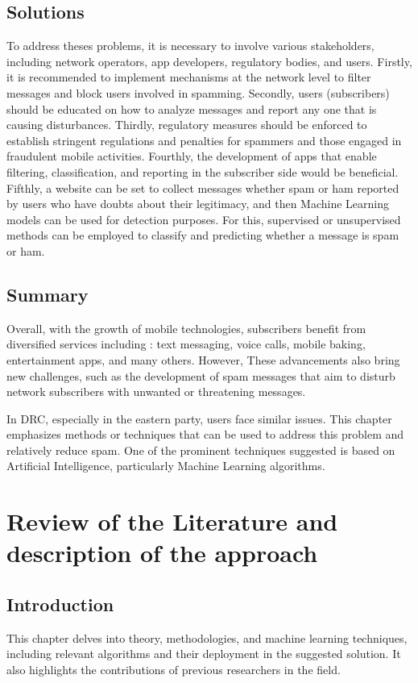 \documentclass[12pt,a4paper]{report}
\begin{document}
\section{Solutions}
To address theses problems, it is necessary to involve various stakeholders, including network operators, app developers, regulatory bodies, and users. Firstly, it is recommended to implement mechanisms at the network level \cite{hao2009detecting} to filter messages and block users involved in spamming. Secondly, users (subscribers) should be educated on how to analyze messages and report any one that is causing disturbances. Thirdly, regulatory measures should be enforced to establish stringent regulations and penalties for spammers and those engaged in fraudulent mobile activities. Fourthly, the development of apps that enable filtering, classification, and reporting in the subscriber side would be beneficial. Fifthly, a website can be set to collect messages whether spam or ham reported by users who have doubts about their legitimacy, and then Machine Learning models can be used for detection purposes. For this, supervised or unsupervised methods can be employed to classify and predicting whether a message is spam or  ham. 
\section{Summary}
Overall, with the growth of mobile technologies, subscribers benefit from diversified services including : text messaging, voice calls, mobile baking, entertainment apps, and many others. However, These advancements also bring new challenges, such as the development of spam messages that aim to disturb network subscribers with unwanted or threatening messages. 

In DRC, especially in the eastern party, users face similar issues. This chapter emphasizes methods or techniques that can be used to address this problem and relatively reduce spam. One of the prominent techniques suggested is based on Artificial Intelligence, particularly Machine Learning algorithms.
    
    \chapter{Review of the Literature and description of the approach}
    \section{Introduction}
    This chapter delves into theory, methodologies, and machine learning techniques, including relevant algorithms and their deployment in the suggested solution. It also highlights the contributions of previous researchers in the field.  
\end{document}
